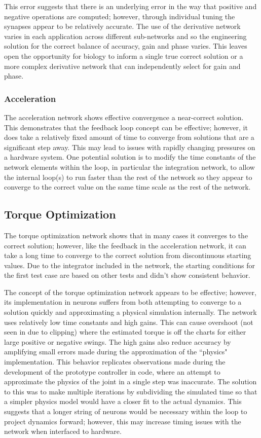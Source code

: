 \documentclass[letterpaper, 10 pt, conference]{IEEEconf} %
\newcommand{\myref}[1]{\hyperref[#1]{\Cref{#1}}}
\newcommand{\bbss}[1]{\subsection{#1}}
\newcommand{\bbsss}[1]{\subsubsection{#1}}
\begin{document}
This error suggests that there is an underlying error in the way that positive 
and negative operations are computed; however, through individual tuning the 
synapses appear to be relatively accurate. The use of the derivative network 
varies in each application across different sub-networks and so the engineering 
solution for the correct balance of accuracy, gain and phase varies. This 
leaves open the opportunity for biology to inform a single true correct 
solution or a more complex derivative network that can independently select for 
gain and phase.

\bbsss{Acceleration}

The acceleration network shows effective convergence a near-correct solution. 
This demonstrates that the feedback loop concept can be effective; however, it 
does take a relatively fixed amount of time to
converge from solutions that are a significant step away. This may lead to 
issues with rapidly changing pressures on a hardware system. One potential 
solution is to modify the time constants of the network
elements within the loop, in particular the integration network, to allow the 
internal loop(s) to run faster than the rest of the network
so they appear to converge to the correct value on the same time scale as the 
rest of the network.

\bbss{Torque Optimization}

The torque optimization network shows that in many cases it converges to the 
correct solution; however, like the feedback in the acceleration network, it can
take a long time to converge to the correct solution from discontinuous starting
values. Due to the integrator included in the network, the starting conditions
for the first test case are based on other tests and didn't show consistent
behavior.

The concept of the torque optimization network appears to be effective; however,
its implementation in neurons suffers from both attempting to converge to a
solution quickly and approximating a physical simulation internally. The network
uses relatively low time constants and high gains. This can cause overshoot 
(not seen in \myref{fig:TestTorqueOptimization} due to clipping) where the 
estimated torque is off the charts for either large positive or negative swings.
The high gains also reduce accuracy by amplifying small errors made during the
approximation of the ``physics" implementation. This behavior replicates 
observations made during the development of the prototype controller in code,
where an attempt to approximate the physics of the joint in a single step was 
inaccurate. The solution to this was to make multiple iterations by subdividing 
the simulated time so that a simpler physics model would have a closer fit to 
the actual dynamics. This suggests that a longer string of neurons would be 
necessary within the loop to project dynamics forward; however, this may 
increase timing issues with the network when interfaced to hardware.
\end{document}
